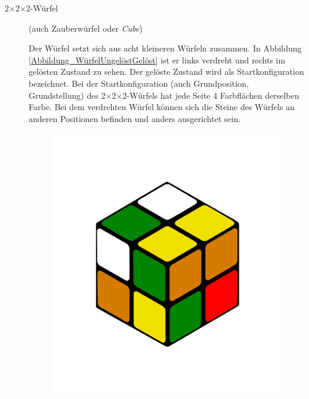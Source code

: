 \documentclass[12pt,a4paper, usenames, dvipsnames]{article}
\theoremstyle{mystyle}
\theoremstyle{definition}
\newcommand{\Ttwo}{2$\times$2$\times$2-}
\begin{document}
\begin{description}


\item[\Ttwo Würfel] (auch Zauberwürfel oder \textit{Cube}) 

Der Würfel setzt sich aus acht kleineren Würfeln zusammen.
In Abbildung \ref{Abbildung_WürfelUngelöstGelöst} ist er links verdreht und rechts im gelösten Zustand zu sehen. Der gelöste Zustand wird als Startkonfiguration bezeichnet.
Bei der Startkonfiguration (auch Grundposition, Grundstellung) des \Ttwo Würfels hat jede Seite 4 Farbflächen derselben Farbe. 
Bei dem verdrehten Würfel können sich die Steine des Würfels an anderen Positionen befinden und anders ausgerichtet sein.
\begin{figure}[h]
\centering
\includegraphics[scale=0.1]{2x2scrambled.png}

\end{figure}
\end{description}
\end{document}
